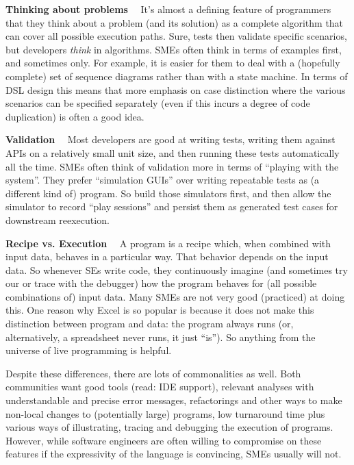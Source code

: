 \documentclass[runningheads]{llncs}
\newcommand\parhead[1]{\vspace{1mm}\noindent\textbf{{#1}}\ \ }
\begin{document}
\parhead{Thinking about problems} It's almost a defining feature of programmers
that they think about a problem (and its solution) as a complete algorithm
that can cover all possible execution paths. Sure, tests then validate 
specific scenarios, but developers \emph{think} in algorithms. SMEs often
think in terms of examples first, and sometimes only. For example, it is easier
for them to deal with a (hopefully complete) set of sequence diagrams rather
than with a state machine. In terms of DSL design this means that more
emphasis on case distinction where the various scenarios can be specified
separately (even if this incurs a degree of code duplication) is often 
a good idea.

\parhead{Validation} Most developers are good at writing tests, writing
them against APIs on a relatively small unit size, and then running these
tests automatically all the time. SMEs often think of validation more in
terms of ``playing with the system''. They prefer ``simulation GUIs'' over
writing repeatable tests as (a different kind of) program. So build those
simulators first, and then allow the simulator to record ``play sessions''
and persist them as generated test cases for downstream reexecution.

\parhead{Recipe vs. Execution} A program is a recipe which, when combined
with input data, behaves in a particular way. That behavior depends on the
input data. So whenever SEs write code, they continuously imagine (and sometimes
try our or trace with the debugger) how the program behaves for (all possible
combinations of) input data. Many SMEs are not very good (practiced) at doing
this. One reason why Excel is so popular is because it does not make this
distinction between program and data: the program always runs (or, alternatively,
a spreadsheet never runs, it just ``is''). So anything from the universe of
live programming is helpful.

\vspace{3mm}
\noindent Despite these differences, there are lots of commonalities as well.
Both communities want good tools (read: IDE support), relevant analyses with
understandable and precise error messages, refactorings and other ways to make
non-local changes to (potentially large) programs, low turnaround time plus
various ways of illustrating, tracing and debugging the execution of programs.  
However, while software engineers are often willing to compromise on these
features if the expressivity of the language is convincing, SMEs usually will 
not.
\end{document}
